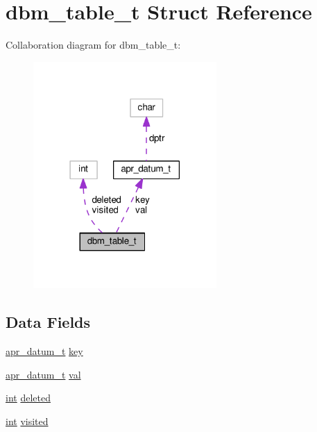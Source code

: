 \hypertarget{structdbm__table__t}{}\section{dbm\+\_\+table\+\_\+t Struct Reference}
\label{structdbm__table__t}


Collaboration diagram for dbm\+\_\+table\+\_\+t\+:
\nopagebreak
\begin{figure}[H]
\begin{center}
\leavevmode
\includegraphics[width=198pt]{structdbm__table__t__coll__graph}
\end{center}
\end{figure}
\subsection*{Data Fields}
\begin{DoxyCompactItemize}
\item 
\hyperlink{structapr__datum__t}{apr\+\_\+datum\+\_\+t} \hyperlink{structdbm__table__t_a0533b8a8cbffb533bdd2c11309bfef71}{key}
\item 
\hyperlink{structapr__datum__t}{apr\+\_\+datum\+\_\+t} \hyperlink{structdbm__table__t_a27fe01c35a227d5d012524d7748366a7}{val}
\item 
\hyperlink{pcre_8txt_a42dfa4ff673c82d8efe7144098fbc198}{int} \hyperlink{structdbm__table__t_a9bc058ae285d64795327cb4ef086792b}{deleted}
\item 
\hyperlink{pcre_8txt_a42dfa4ff673c82d8efe7144098fbc198}{int} \hyperlink{structdbm__table__t_aff3d4175910cee9991ce3e89ad29e5fc}{visited}
\end{DoxyCompactItemize}


